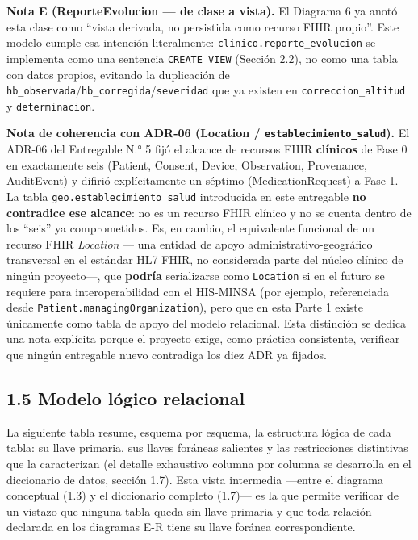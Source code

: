 \documentclass[11pt,a4paper]{article}
\begin{document}
\textbf{Nota E (ReporteEvolucion --- de clase a vista).} El Diagrama 6 ya anotó esta clase como ``vista derivada, no persistida como recurso FHIR propio''. Este modelo cumple esa intención literalmente: \texttt{clinico.reporte\_evolucion} se implementa como una sentencia \texttt{CREATE\ VIEW} (Sección 2.2), no como una tabla con datos propios, evitando la duplicación de \texttt{hb\_observada}/\texttt{hb\_corregida}/\texttt{severidad} que ya existen en \texttt{correccion\_altitud} y \texttt{determinacion}.

\textbf{Nota de coherencia con ADR-06 (Location / \texttt{establecimiento\_salud}).} El ADR-06 del Entregable N.° 5 fijó el alcance de recursos FHIR \textbf{clínicos} de Fase 0 en exactamente seis (Patient, Consent, Device, Observation, Provenance, AuditEvent) y difirió explícitamente un séptimo (MedicationRequest) a Fase 1. La tabla \texttt{geo.establecimiento\_salud} introducida en este entregable \textbf{no contradice ese alcance}: no es un recurso FHIR clínico y no se cuenta dentro de los ``seis'' ya comprometidos. Es, en cambio, el equivalente funcional de un recurso FHIR \emph{Location} --- una entidad de apoyo administrativo-geográfico transversal en el estándar HL7 FHIR, no considerada parte del núcleo clínico de ningún proyecto---, que \textbf{podría} serializarse como \texttt{Location} si en el futuro se requiere para interoperabilidad con el HIS-MINSA (por ejemplo, referenciada desde \texttt{Patient.managingOrganization}), pero que en esta Parte 1 existe únicamente como tabla de apoyo del modelo relacional. Esta distinción se dedica una nota explícita porque el proyecto exige, como práctica consistente, verificar que ningún entregable nuevo contradiga los diez ADR ya fijados.

\subsection{1.5 Modelo lógico relacional}\label{modelo-luxf3gico-relacional}

La siguiente tabla resume, esquema por esquema, la estructura lógica de cada tabla: su llave primaria, sus llaves foráneas salientes y las restricciones distintivas que la caracterizan (el detalle exhaustivo columna por columna se desarrolla en el diccionario de datos, sección 1.7). Esta vista intermedia ---entre el diagrama conceptual (1.3) y el diccionario completo (1.7)--- es la que permite verificar de un vistazo que ninguna tabla queda sin llave primaria y que toda relación declarada en los diagramas E-R tiene su llave foránea correspondiente.
\end{document}
